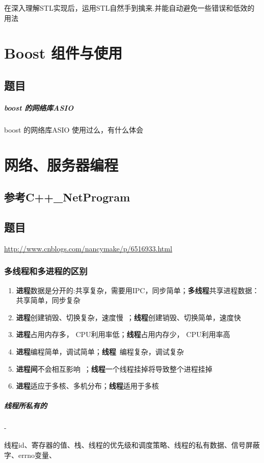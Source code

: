 \documentclass[UTF8,a4paper,8pt]{ctexart}
\begin{document}
		在深入理解STL实现后，运用STL自然手到擒来.并能自动避免一些错误和低效的用法
		
		
\newpage
\section{Boost 组件与使用}
	\subsection{题目}
		\subparagraph{boost 的网络库ASIO}  boost 的网络库ASIO 使用过么，有什么体会
		

\newpage
\section{网络、服务器编程}
	\subsection{参考C++\_NetProgram}
	
	\subsection{题目}
		\url{http://www.cnblogs.com/nancymake/p/6516933.html}
		
		\subsubsection{多线程和多进程的区别}
			\begin{enumerate}
				\item \textbf{进程}数据是分开的:共享复杂，需要用IPC，同步简单；\textbf{多线程}共享进程数据：共享简单，同步复杂
				\item \textbf{进程}创建销毁、切换复杂，速度慢 ；\textbf{线程}创建销毁、切换简单，速度快 
				\item \textbf{进程}占用内存多， CPU利用率低；\textbf{线程}占用内存少， CPU利用率高
				\item \textbf{进程}编程简单，调试简单；\textbf{线程} 编程复杂，调试复杂
				\item \textbf{进程间}不会相互影响 ；\textbf{线程}一个线程挂掉将导致整个进程挂掉
				\item \textbf{进程}适应于多核、多机分布；\textbf{线程}适用于多核
			\end{enumerate}
		
			\subparagraph{线程所私有的}-
			
			线程id、寄存器的值、栈、线程的优先级和调度策略、线程的私有数据、信号屏蔽字、errno变量、
\end{document}
